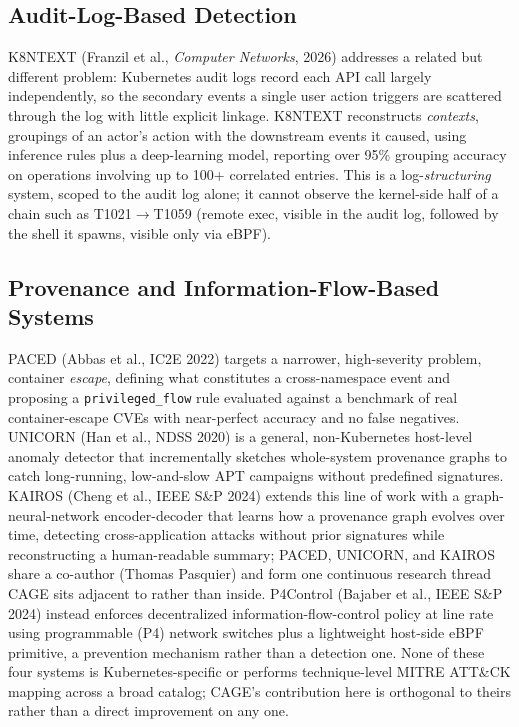 \documentclass{ieeeaccess}
\begin{document}
\subsection{Audit-Log-Based Detection}
\label{subsec:rw-audit}

K8NTEXT \cite{ref3} (Franzil et al., \emph{Computer Networks}, 2026) addresses a
related but different problem: Kubernetes audit logs record each API
call largely independently, so the secondary events a single user
action triggers are scattered through the log with little explicit
linkage. K8NTEXT reconstructs \emph{contexts}, groupings of an actor's action
with the downstream events it caused, using inference rules plus a
deep-learning model, reporting over 95\% grouping accuracy on
operations involving up to 100+ correlated entries. This is a
log-\emph{structuring} system, scoped to the audit log alone; it cannot
observe the kernel-side half of a chain such as T1021$\to$T1059 (remote
exec, visible in the audit log, followed by the shell it spawns,
visible only via eBPF).

\subsection{Provenance and Information-Flow-Based Systems}
\label{subsec:rw-provenance}

PACED \cite{ref4} (Abbas et al., IC2E 2022) targets a narrower, high-severity
problem, container \emph{escape}, defining what constitutes a cross-namespace
event and proposing a \texttt{privileged\_flow} rule evaluated against a
benchmark of real container-escape CVEs with near-perfect accuracy and
no false negatives. UNICORN \cite{ref5} (Han et al., NDSS 2020) is a general,
non-Kubernetes host-level anomaly detector that incrementally sketches
whole-system provenance graphs to catch long-running, low-and-slow APT
campaigns without predefined signatures. KAIROS \cite{ref12} (Cheng et al.,
IEEE S\&P 2024) extends this line of work with a graph-neural-network
encoder-decoder that learns how a provenance graph evolves over time,
detecting cross-application attacks without prior signatures while
reconstructing a human-readable summary; PACED, UNICORN, and KAIROS
share a co-author (Thomas Pasquier) and form one continuous research
thread CAGE sits adjacent to rather than inside. P4Control \cite{ref8}
(Bajaber et al., IEEE S\&P 2024) instead enforces decentralized
information-flow-control policy at line rate using programmable (P4)
network switches plus a lightweight host-side eBPF primitive, a
prevention mechanism rather than a detection one. None of these four
systems is Kubernetes-specific or performs technique-level MITRE
ATT\&CK mapping across a broad catalog; CAGE's contribution here is
orthogonal to theirs rather than a direct improvement on any one.
\end{document}
